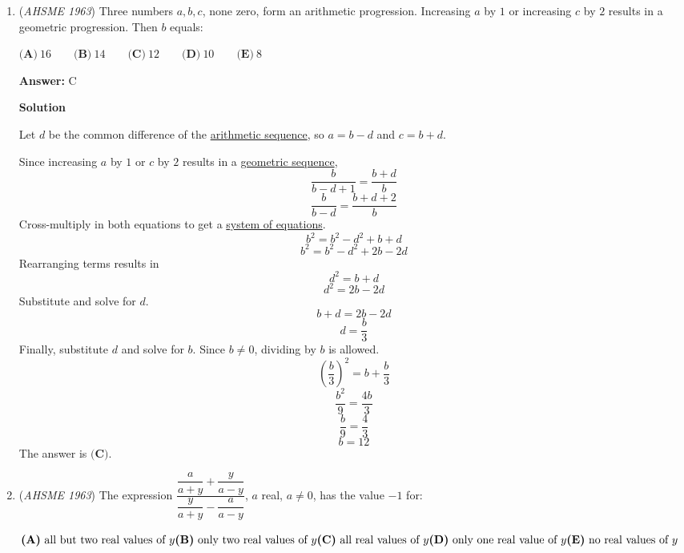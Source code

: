 \begin{enumerate}
 \[\rightarrow \boxed{\textbf{(C)}}\]



	\item (\textit{AHSME 1963}) Three numbers $a,b,c$, none zero, form an arithmetic progression. Increasing $a$ by $1$ or increasing $c$ by $2$ results 
in a geometric progression. Then $b$ equals:


 $\textbf{(A)}\ 16 \qquad \textbf{(B)}\ 14 \qquad \textbf{(C)}\ 12 \qquad \textbf{(D)}\ 10 \qquad \textbf{(E)}\ 8$

 \textbf{Answer: }C



\textbf{Solution}

Let $d$ be the common difference of the \href{https://artofproblemsolving.com/wiki/index.php?title=Arithmetic\_sequence}{arithmetic sequence}, so $a = b-d$ and $c = b+d$.

 Since increasing $a$ by $1$ or $c$ by $2$ results in a \href{https://artofproblemsolving.com/wiki/index.php?title=Geometric\_sequence}{geometric sequence},
 \[\frac{b}{b-d+1} = \frac{b+d}{b}\]
 \[\frac{b}{b-d} = \frac{b+d+2}{b}\]Cross-multiply in both equations to get a \href{https://artofproblemsolving.com/wiki/index.php?title=System\_of\_equations}{system of equations}.
 \[b^2 = b^2 - d^2 + b + d\]
 \[b^2 = b^2 - d^2 + 2b - 2d\]Rearranging terms results in
 \[d^2 = b+d\]
 \[d^2 = 2b-2d\]Substitute and solve for $d$.
 \[b+d = 2b-2d\]
 \[d = \frac{b}{3}\]Finally, substitute $d$ and solve for $b$.  Since $b \ne 0$, dividing by $b$ is allowed.
 \[(\frac{b}{3})^2 = b + \frac{b}{3}\]
 \[\frac{b^2}{9} = \frac{4b}{3}\]
 \[\frac{b}{9} = \frac{4}{3}\]
 \[b = 12\]The answer is $\boxed{\textbf{(C)}}$.

 


 


	\item (\textit{AHSME 1963}) The expression $\dfrac{\dfrac{a}{a+y}+\dfrac{y}{a-y}}{\dfrac{y}{a+y}-\dfrac{a}{a-y}}$, $a$ real, $a\neq 0$, has the value $-1$ for:


 $\textbf{(A)}\ \text{all but two real values of }y \qquad \\ \textbf{(B)}\ \text{only two real values of }y \qquad \\ \textbf{(C)}\ \text{all real values of }y\qquad \\ \textbf{(D)}\ \text{only one real value of }y\qquad \\ \textbf{(E)}\ \text{no real values of }y$


\end{enumerate}
